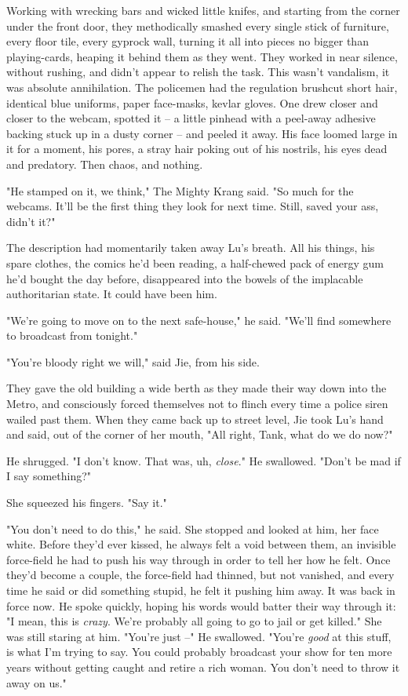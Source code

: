 Working with wrecking bars and wicked little knifes, and starting
from the corner under the front door, they methodically smashed
every single stick of furniture, every floor tile, every gyprock
wall, turning it all into pieces no bigger than playing-cards,
heaping it behind them as they went. They worked in near silence,
without rushing, and didn't appear to relish the task. This wasn't
vandalism, it was absolute annihilation. The policemen had the
regulation brushcut short hair, identical blue uniforms, paper
face-masks, kevlar gloves. One drew closer and closer to the
webcam, spotted it -- a little pinhead with a peel-away adhesive
backing stuck up in a dusty corner -- and peeled it away. His face
loomed large in it for a moment, his pores, a stray hair poking out
of his nostrils, his eyes dead and predatory. Then chaos, and
nothing.

"He stamped on it, we think," The Mighty Krang said. "So much for
the webcams. It'll be the first thing they look for next time.
Still, saved your ass, didn't it?"

The description had momentarily taken away Lu's breath. All his
things, his spare clothes, the comics he'd been reading, a
half-chewed pack of energy gum he'd bought the day before,
disappeared into the bowels of the implacable authoritarian state.
It could have been him.

"We're going to move on to the next safe-house," he said. "We'll
find somewhere to broadcast from tonight."

"You're bloody right we will," said Jie, from his side.

They gave the old building a wide berth as they made their way down
into the Metro, and consciously forced themselves not to flinch
every time a police siren wailed past them. When they came back up
to street level, Jie took Lu's hand and said, out of the corner of
her mouth, "All right, Tank, what do we do now?"

He shrugged. "I don't know. That was, uh, \emph{close}." He
swallowed. "Don't be mad if I say something?"

She squeezed his fingers. "Say it."

"You don't need to do this," he said. She stopped and looked at
him, her face white. Before they'd ever kissed, he always felt a
void between them, an invisible force-field he had to push his way
through in order to tell her how he felt. Once they'd become a
couple, the force-field had thinned, but not vanished, and every
time he said or did something stupid, he felt it pushing him away.
It was back in force now. He spoke quickly, hoping his words would
batter their way through it: "I mean, this is \emph{crazy}. We're
probably all going to go to jail or get killed." She was still
staring at him. "You're just --" He swallowed. "You're \emph{good}
at this stuff, is what I'm trying to say. You could probably
broadcast your show for ten more years without getting caught and
retire a rich woman. You don't need to throw it away on us."

